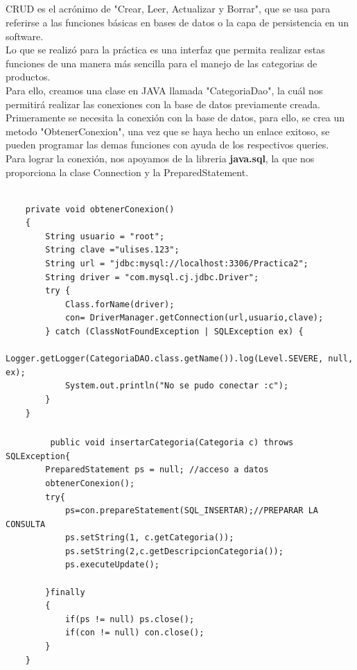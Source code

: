 \documentclass[10pt,a4paper]{article}
\begin{document}
\subsection{\color{colorESCOM}{Presentación del CRUD}}
\normalsize{
CRUD es el acrónimo de "Crear, Leer, Actualizar y Borrar", que se usa para referirse a las funciones básicas en bases de datos o la capa de persistencia en un software.
\\
Lo que se realizó para la práctica es una interfaz que permita realizar estas funciones de una manera más sencilla para el manejo de las categorias de productos. 
\\
Para ello, creamos una clase en JAVA llamada "CategoriaDao", la cuál nos permitirá realizar las conexiones con la base de datos previamente creada. 
\\
Primeramente se necesita la conexión con la base de datos, para ello, se crea un metodo "ObtenerConexion", una vez que se haya hecho un enlace exitoso, se pueden programar las demas funciones con ayuda de los respectivos queries.
\\
Para lograr la conexión, nos apoyamos de la libreria \textbf{java.sql}, la que nos proporciona la clase Connection y la PreparedStatement.
\\
\\
}
\begin{lstlisting}
	private void obtenerConexion()
    {
        String usuario = "root";
        String clave ="ulises.123";
        String url = "jdbc:mysql://localhost:3306/Practica2";
        String driver = "com.mysql.cj.jdbc.Driver";
        try {
            Class.forName(driver);
            con= DriverManager.getConnection(url,usuario,clave);
        } catch (ClassNotFoundException | SQLException ex) {
            Logger.getLogger(CategoriaDAO.class.getName()).log(Level.SEVERE, null, ex);
            System.out.println("No se pudo conectar :c");
        }
    }
\end{lstlisting} \hfill


\subsubsection{\color{colorGENERICO}{Crear}}
\begin{lstlisting}
	     public void insertarCategoria(Categoria c) throws SQLException{
        PreparedStatement ps = null; //acceso a datos
        obtenerConexion();
        try{
            ps=con.prepareStatement(SQL_INSERTAR);//PREPARAR LA CONSULTA
            ps.setString(1, c.getCategoria());
            ps.setString(2,c.getDescripcionCategoria());
            ps.executeUpdate();
  
        }finally
        {
            if(ps != null) ps.close();
            if(con != null) con.close();
        }
    }
\end{lstlisting} \hfill
\end{document}
